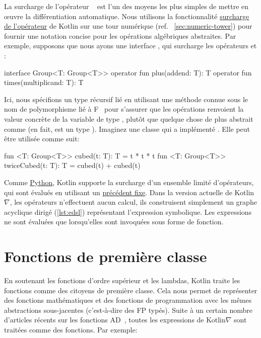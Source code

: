 La surcharge de l'opérateur \noindent~\citep{corliss1993operator} est l'un des moyens les plus simples de mettre en œuvre la différentiation automatique. Nous utilisons la fonctionnalité \href{https://kotlinlang.org/docs/reference/operator-overloading.html}{surcharge de l'opérateur} de Kotlin sur une tour numérique (ref. ~\autoref{sec:numeric-tower}) pour fournir une notation concise pour les opérations algébriques abstraites. Par exemple, supposons que nous ayons une interface , qui surcharge les opérateurs \inline{+} et \inline{*}:
%
\begin{kotlinlisting}
interface Group<T: Group<T>> {
    operator fun plus(addend: T): T
    operator fun times(multiplicand: T): T
}
\end{kotlinlisting}
%
Ici, nous spécifions un type récursif lié en utilisant une méthode connue sous le nom de polymorphisme lié à F~\citep{canning1989f} pour s'assurer que les opérations renvoient la valeur concrète de la variable de type , plutôt que quelque chose de plus abstrait comme  (en fait,  est un type ). Imaginez une classe  qui a implémenté . Elle peut être utilisée comme suit:
%
\begin{kotlinlisting}
fun <T: Group<T>> cubed(t: T): T = t * t * t
fun <T: Group<T>> twiceCubed(t: T): T = cubed(t) + cubed(t)
\end{kotlinlisting}
%
Comme \href{https://docs.python.org/3/reference/datamodel.html#special-method-names}{Python}, Kotlin supporte la surcharge d'un ensemble limité d'opérateurs, qui sont évalués en utilisant un \href{https://kotlinlang.org/docs/reference/grammar.html#precedence}{précédent fixe}. Dans la version actuelle de Kotlin$\nabla$, les opérateurs n'effectuent aucun calcul, ils construisent simplement un graphe acyclique dirigé (\autoref{lst:edsl}) représentant l'expression symbolique. Les expressions ne sont évaluées que lorsqu'elles sont invoquées sous forme de fonction.

\section{Fonctions de première classe}\label{sec:first-class-functions}

En soutenant les fonctions d'ordre supérieur et les lambdas, Kotlin traite les fonctions comme des citoyens de première classe. Cela nous permet de représenter des fonctions mathématiques et des fonctions de programmation avec les mêmes abstractions sous-jacentes (c'est-à-dire des FP typés). Suite à un certain nombre d'articles récents sur les fonctions AD~\citep{pearlmutter2008reverse,wang2018backpropagation}, toutes les expressions de Kotlin$\nabla$ sont traitées comme des fonctions. Par exemple:

